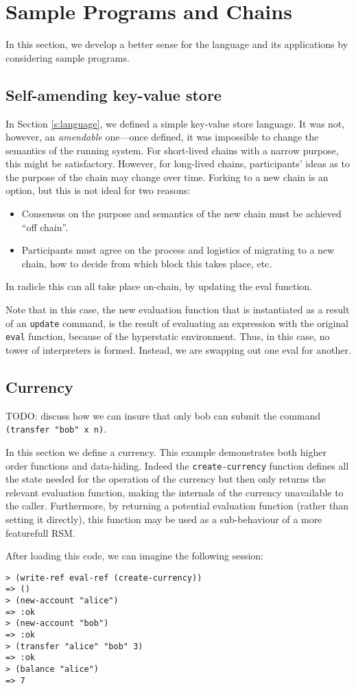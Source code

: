 \section{Sample Programs and Chains}
\label{s:examples}

In this section, we develop a better sense for the language and its
applications by considering sample programs.

\subsection{Self-amending key-value store}

In Section \ref{s:language}, we defined a simple key-value store language. It
was not, however, an \emph{amendable} one---once defined, it was impossible to
change the semantics of the running system. For short-lived chains with a narrow
purpose, this might be satisfactory. However, for long-lived chains, participants'
ideas as to the purpose of the chain may change over time. Forking to a new chain is
an option, but this is not ideal for two reasons:
\begin{itemize}
  \item Consensus on the purpose and semantics of the new chain must be achieved
    ``off chain''.
  \item Participants must agree on the process and logistics of migrating to a
    new chain, how to decide from which block this takes place, etc.
\end{itemize}
In radicle this can all take place on-chain, by updating the eval function.

Note that in this case, the new evaluation function that is instantiated as a
result of an \texttt{update} command, is the result of evaluating an
expression with the original \texttt{eval} function, because of the hyperstatic
environment. Thus, in this case, no tower of interpreters is formed. Instead,
we are swapping out one eval for another.

\subsection{Currency}

TODO: discuss how we can insure that only bob can submit the command
\texttt{(transfer "bob" x n)}.

In this section we define a currency. This example demonstrates both higher
order functions and data-hiding. Indeed the \texttt{create-currency} function
defines all the state needed for the operation of the currency but then only
returns the relevant evaluation function, making the internals of the currency
unavailable to the caller. Furthermore, by returning a potential evaluation
function (rather than setting it directly), this function may be used as a
sub-behaviour of a more featurefull RSM.

After loading this code, we can imagine the following \rad{} session:
\bigskip
\begin{Verbatim}[fontsize=\small]
> (write-ref eval-ref (create-currency))
=> ()
> (new-account "alice")
=> :ok
> (new-account "bob")
=> :ok
> (transfer "alice" "bob" 3)
=> :ok
> (balance "alice")
=> 7
\end{Verbatim}


